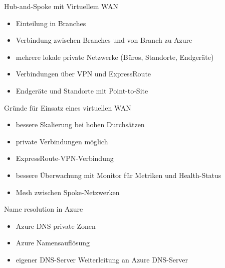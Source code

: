 \begin{flashcard}[]{Hub-and-Spoke mit Virtuellem WAN}
  \begin{itemize}
    \item Einteilung in Branches
    \item Verbindung zwischen Branches und von Branch zu Azure
    \item mehrere lokale private Netzwerke (Büros, Standorte, Endgeräte)
    \item Verbindungen über VPN und ExpressRoute
    \item Endgeräte und Standorte mit Point-to-Site
  \end{itemize}
\end{flashcard}

\begin{flashcard}[]{Gründe für Einsatz eines virtuellen WAN}
  \begin{itemize}
    \item bessere Skalierung bei hohen Durchsätzen
    \item private Verbindungen möglich
    \item ExpressRoute-VPN-Verbindung
    \item bessere Überwachung mit Monitor für Metriken und Health-Status
    \item Mesh zwischen Spoke-Netzwerken
  \end{itemize}
\end{flashcard}


\begin{flashcard}[]{Name resolution in Azure}
  \begin{itemize}
    \item Azure DNS private Zonen
    \item Azure Namensauflösung
    \item eigener DNS-Server\newline
      Weiterleitung an Azure DNS-Server
  \end{itemize}
\end{flashcard}

